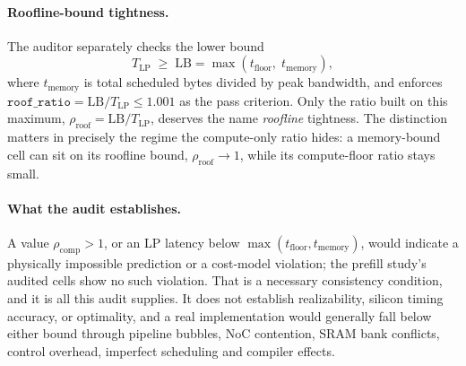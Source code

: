\paragraph{Roofline-bound tightness.}
The auditor separately checks the lower bound
\begin{equation}
    T_{\mathrm{LP}}
    \;\geq\;
    \mathrm{LB} = \max\!\left(t_{\mathrm{floor}},\; t_{\mathrm{memory}}\right),
    \label{eq:roofline_lb}
\end{equation}
where $t_{\mathrm{memory}}$ is total scheduled bytes divided by peak bandwidth, and enforces $\texttt{roof\_ratio} = \mathrm{LB}/T_{\mathrm{LP}} \le 1.001$ as the pass criterion. Only the ratio built on this maximum, $\rho_{\mathrm{roof}} = \mathrm{LB}/T_{\mathrm{LP}}$, deserves the name \emph{roofline} tightness. The distinction matters in precisely the regime the compute-only ratio hides: a memory-bound cell can sit on its roofline bound, $\rho_{\mathrm{roof}} \to 1$, while its compute-floor ratio stays small.
\paragraph{What the audit establishes.}
A value $\rho_{\mathrm{comp}} > 1$, or an LP latency below $\max(t_{\mathrm{floor}}, t_{\mathrm{memory}})$, would indicate a physically impossible prediction or a cost-model violation; the prefill study's audited cells show no such violation.
That is a necessary consistency condition, and it is all this audit supplies.
It does not establish realizability, silicon timing accuracy, or optimality, and a real implementation would generally fall below either bound through pipeline bubbles, NoC contention, SRAM bank conflicts, control overhead, imperfect scheduling and compiler effects.


